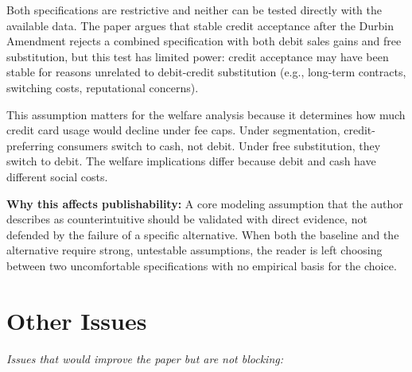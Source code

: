 \documentclass[11pt]{article}
\begin{document}
\begin{enumerate}[leftmargin=*]
    Both specifications are restrictive and neither can be tested directly with the available data. The paper argues that stable credit acceptance after the Durbin Amendment rejects a combined specification with both debit sales gains and free substitution, but this test has limited power: credit acceptance may have been stable for reasons unrelated to debit-credit substitution (e.g., long-term contracts, switching costs, reputational concerns).

    This assumption matters for the welfare analysis because it determines how much credit card usage would decline under fee caps. Under segmentation, credit-preferring consumers switch to cash, not debit. Under free substitution, they switch to debit. The welfare implications differ because debit and cash have different social costs.

    \textbf{Why this affects publishability:} A core modeling assumption that the author describes as counterintuitive should be validated with direct evidence, not defended by the failure of a specific alternative. When both the baseline and the alternative require strong, untestable assumptions, the reader is left choosing between two uncomfortable specifications with no empirical basis for the choice.

\end{enumerate}

\section{Other Issues}

\textit{Issues that would improve the paper but are not blocking:}
\end{document}
